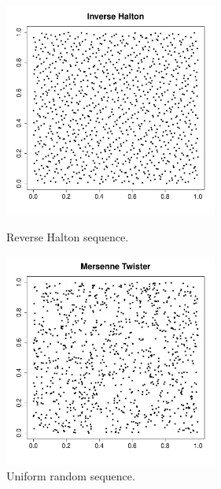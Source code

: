              \begin{figure}[H]
               \begin{minipage}{10cm}
                 \begin{center}
                   \includegraphics[width=7cm]{Figures/reverseHalton_cloud.pdf}
                   \caption{Reverse Halton sequence.}
                   \label{ReverseHalton}
                 \end{center}
               \end{minipage}
               \hfill
               \begin{minipage}{10cm}
                 \begin{center}
                   \includegraphics[width=7cm]{Figures/mersenne_twister_cloud.pdf}
                   \caption{Uniform random sequence.}
                   \label{Uniform}
                 \end{center}
               \end{minipage}
             \end{figure}
